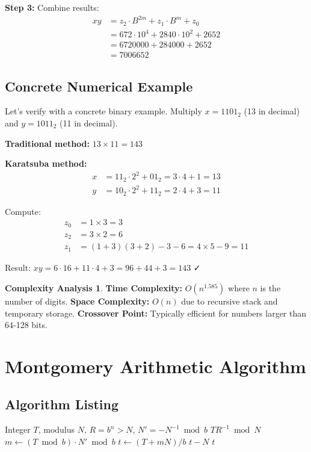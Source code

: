 \documentclass[12pt,a4paper]{article}
\theoremstyle{definition}
\newtheorem{complexity}{Complexity Analysis}[section]
\begin{document}
\textbf{Step 3:} Combine results:
\begin{align}
xy &= z_2 \cdot B^{2m} + z_1 \cdot B^m + z_0\\
   &= 672 \cdot 10^4 + 2840 \cdot 10^2 + 2652\\
   &= 6720000 + 284000 + 2652\\
   &= 7006652
\end{align}

\subsection{Concrete Numerical Example}

Let's verify with a concrete binary example. Multiply $x = 1101_2$ (13 in decimal) and $y = 1011_2$ (11 in decimal).

\textbf{Traditional method:} $13 \times 11 = 143$

\textbf{Karatsuba method:}
\begin{align}
x &= 11_2 \cdot 2^2 + 01_2 = 3 \cdot 4 + 1 = 13\\
y &= 10_2 \cdot 2^2 + 11_2 = 2 \cdot 4 + 3 = 11
\end{align}

Compute:
\begin{align}
z_0 &= 1 \times 3 = 3\\
z_2 &= 3 \times 2 = 6\\
z_1 &= (1 + 3)(3 + 2) - 3 - 6 = 4 \times 5 - 9 = 11
\end{align}

Result: $xy = 6 \cdot 16 + 11 \cdot 4 + 3 = 96 + 44 + 3 = 143$ ✓

\begin{complexity}
\textbf{Time Complexity:} $O(n^{1.585})$ where $n$ is the number of digits.
\textbf{Space Complexity:} $O(n)$ due to recursive stack and temporary storage.
\textbf{Crossover Point:} Typically efficient for numbers larger than 64-128 bits.
\end{complexity}

\section{Montgomery Arithmetic Algorithm}

\subsection{Algorithm Listing}

\begin{algorithm}[H]
\caption{Montgomery Reduction (REDC)}
\label{alg:montgomery}
\begin{algorithmic}[1]
\REQUIRE Integer $T$, modulus $N$, $R = b^n > N$, $N' = -N^{-1} \bmod b$
\ENSURE $TR^{-1} \bmod N$
\STATE $m \leftarrow (T \bmod b) \cdot N' \bmod b$
\STATE $t \leftarrow (T + mN) / b$
    \RETURN $t - N$
\ELSE
    \RETURN $t$
\ENDIF
\end{algorithmic}
\end{algorithm}
\end{document}

